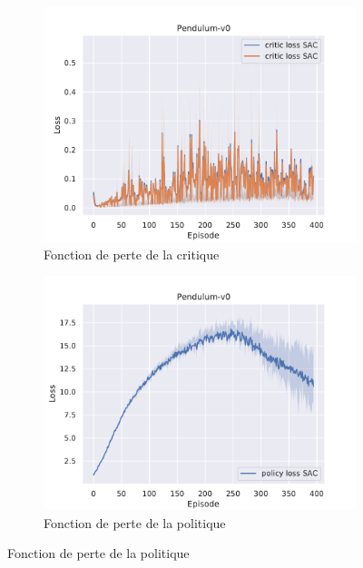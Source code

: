 \begin{figure}[H]
    \centering
    \begin{subfigure}{0.3\textwidth}
        \includegraphics[width=\textwidth]{figures/sac_itr2/critic_loss_Pendulum-v0_pg_dataset_td_eval_True_cycles_40_trajs_20_batches_20_gamma_0.99_nstep_5_lr_act_0.01_lr_critic_0.01pg.pdf}
        \caption{Fonction de perte de la critique}
    \end{subfigure}
    \begin{subfigure}{0.3\textwidth}
        \includegraphics[width=\textwidth]{figures/sac_itr2/policy_loss_Pendulum-v0_pg_dataset_td_eval_True_cycles_40_trajs_20_batches_20_gamma_0.99_nstep_5_lr_act_0.01_lr_critic_0.01pg.pdf}
        \caption{Fonction de perte de la politique}

\end{subfigure}
\end{figure}
